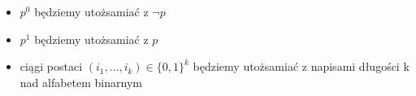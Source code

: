 \begin{itemize}
	\item $p^0$ będziemy utożsamiać z $\neg p$
	\item $p^1$ będziemy utożsamiać z $p$
	\item ciągi postaci $(i_1, ... , i_k) \in \{0, 1\}^k$ będziemy utożsamiać z napisami długości k nad alfabetem binarnym
\end{itemize}